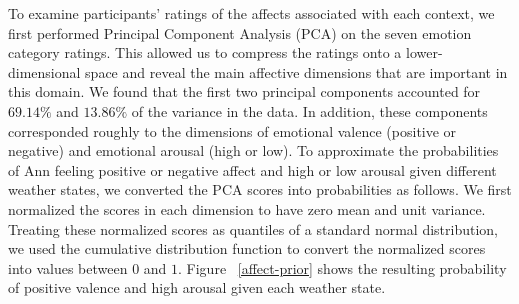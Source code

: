 \documentclass[10pt,letterpaper]{article}
\begin{document}
To examine participants' ratings of the affects associated with each context, we first performed Principal Component Analysis (PCA) on the seven emotion category ratings. This allowed us to compress the ratings onto a lower-dimensional space and reveal the main affective dimensions that are important in this domain. We found that the first two principal components accounted for $69.14\%$ and $13.86\%$ of the variance in the data. In addition, these components corresponded roughly to the dimensions of emotional valence (positive or negative) and emotional arousal (high or low). 
To approximate the probabilities of Ann feeling positive or negative affect and high or low arousal given different weather states, we converted the PCA scores into probabilities as follows. We first normalized the scores in each dimension to have zero mean and unit variance. Treating these normalized scores as quantiles of a standard normal distribution, we used the cumulative distribution function to convert the normalized scores into values between $0$ and $1$. Figure ~\ref{affect-prior} shows the resulting probability of positive valence and high arousal given each weather state. 


%
\end{document}

